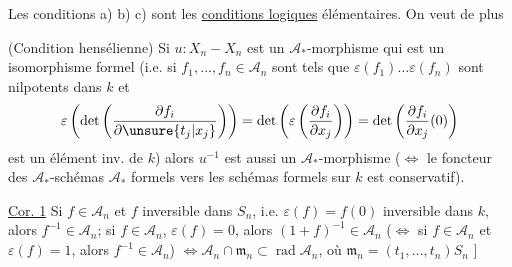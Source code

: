 
Les conditions a) b) c) sont les \uline{conditions logiques} élémentaires. On veut de plus

 (Condition hensélienne) Si $u:X_n\mathbin{-}X_n$ est un $\mathcal A_*$-morphisme qui est un isomorphisme formel (i.e. si $f_1,\ldots,f_n\in \mathcal A_n$ sont tels que $\varepsilon(f_1)\ldots\varepsilon(f_n)$ sont nilpotents dans $k$ et
\[
\varepsilon\left(\det\left(\frac{\partial f_i}{\partial\unsure{t_j|x_j}}\right)\right)
=\det\left(\varepsilon\left(\frac{\partial f_i}{\partial x_j}\right)\right)
=\det\left(\frac{\partial f_i}{\partial x_j}(0)\right)
\]
est un élément inv. de $k$) alors $u^{-1}$ est aussi un $\mathcal A_*$-morphisme ($\Leftrightarrow$ le foncteur des $\mathcal A_*$-schémas $\mathcal A_*$ formels vers les schémas formels sur $k$ est conservatif).

\uline{Cor. 1} Si $f\in \mathcal A_n$ et $f$ inversible dans $S_n$, i.e. $\varepsilon(f)=f(0)$ inversible dans $k$, alors $f^{-1}\in \mathcal A_n$;  si $f\in \mathcal A_n$, $\varepsilon(f)=0$, alors $(1+f)^{-1}\in \mathcal A_n$ ($\Leftrightarrow$ si $f\in \mathcal A_n$ et $\varepsilon(f)=1$, alors $f^{-1}\in \mathcal A_n$) $\Leftrightarrow \mathcal A_n\cap\mathfrak m_n\subset\operatorname{rad}\mathcal A_n$, où  $\mathfrak m_n=(t_1,\ldots,t_n)S_n$ \unsure{\}|]} ]

